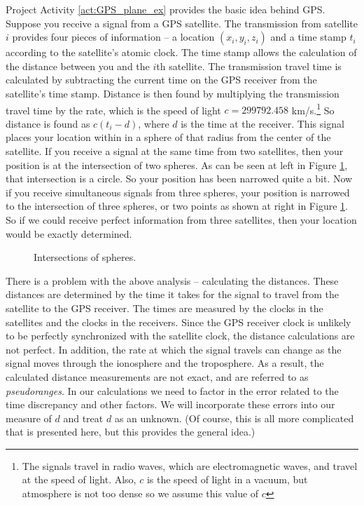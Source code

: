 Project Activity \ref{act:GPS_plane_ex} provides the basic idea behind GPS. Suppose you receive a signal from a GPS satellite. The transmission from satellite $i$ provides four pieces of information --  a location $(x_i,y_i,z_i)$ and a time stamp $t_i$ according to the satellite's atomic clock. The time stamp allows the calculation of the distance between you and the $i$th satellite. The transmission travel time is calculated by subtracting the current time on the GPS receiver from the satellite's time stamp. Distance is then found by multiplying the transmission travel time by the rate, which is the speed of light $c=299792.458$ km/s.\footnote{The signals travel in radio waves, which are electromagnetic waves, and travel at the speed of light. Also, $c$ is the speed of light in a vacuum, but atmosphere is not too dense so we assume this value of $c$} So distance is found as $c(t_i-d)$, where $d$ is the time at the receiver. This signal places your location within in a sphere of that radius from the center of the satellite. If you receive a signal at the same time from two satellites, then your position is at the intersection of two spheres. As can be seen at left in Figure \ref{F:Spheres}, that intersection is a circle. So your position has been narrowed quite a bit. Now if you receive simultaneous signals from three spheres, your position is narrowed to the intersection of three spheres, or two points as shown at right in Figure \ref{F:Spheres}.  So if we could receive perfect information from three satellites, then your location would be exactly determined.
\begin{figure}[h]
\begin{center}
 \hspace{0.5in} 
\caption{Intersections of spheres.}
\label{F:Spheres}
\end{center}
\end{figure}

There is a problem with the above analysis -- calculating the distances. These distances are determined by the time it takes for the signal to travel from the satellite to the GPS receiver. The times are measured by the clocks in the satellites and the clocks in the receivers. Since the GPS receiver clock is unlikely to be perfectly synchronized with the satellite clock, the distance calculations are not perfect. In addition, the rate at which the signal travels can change as the signal moves through the ionosphere and the troposphere. As a result, the calculated distance measurements are not exact, and are referred to as \emph{pseudoranges}. In our calculations we need to factor in the error related to the time discrepancy and other factors. We will incorporate these errors into our measure of $d$ and treat $d$ as an unknown. (Of course, this is all more complicated that is presented here, but this provides the general idea.) 

